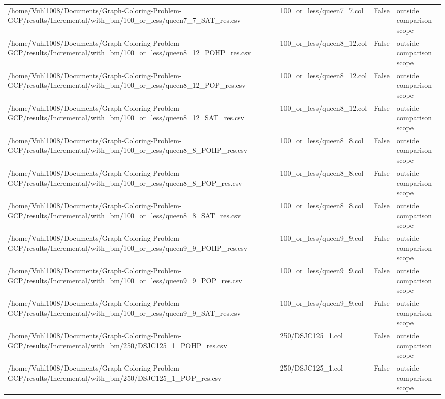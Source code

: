 \begin{table}[htbp]
\begin{tabular}{llll}
/home/Vuhl1008/Documents/Graph-Coloring-Problem-GCP/results/Incremental/with\_bm/100\_or\_less/queen7\_7\_SAT\_res.csv & 100\_or\_less/queen7\_7.col & False & outside comparison scope \\
/home/Vuhl1008/Documents/Graph-Coloring-Problem-GCP/results/Incremental/with\_bm/100\_or\_less/queen8\_12\_POHP\_res.csv & 100\_or\_less/queen8\_12.col & False & outside comparison scope \\
/home/Vuhl1008/Documents/Graph-Coloring-Problem-GCP/results/Incremental/with\_bm/100\_or\_less/queen8\_12\_POP\_res.csv & 100\_or\_less/queen8\_12.col & False & outside comparison scope \\
/home/Vuhl1008/Documents/Graph-Coloring-Problem-GCP/results/Incremental/with\_bm/100\_or\_less/queen8\_12\_SAT\_res.csv & 100\_or\_less/queen8\_12.col & False & outside comparison scope \\
/home/Vuhl1008/Documents/Graph-Coloring-Problem-GCP/results/Incremental/with\_bm/100\_or\_less/queen8\_8\_POHP\_res.csv & 100\_or\_less/queen8\_8.col & False & outside comparison scope \\
/home/Vuhl1008/Documents/Graph-Coloring-Problem-GCP/results/Incremental/with\_bm/100\_or\_less/queen8\_8\_POP\_res.csv & 100\_or\_less/queen8\_8.col & False & outside comparison scope \\
/home/Vuhl1008/Documents/Graph-Coloring-Problem-GCP/results/Incremental/with\_bm/100\_or\_less/queen8\_8\_SAT\_res.csv & 100\_or\_less/queen8\_8.col & False & outside comparison scope \\
/home/Vuhl1008/Documents/Graph-Coloring-Problem-GCP/results/Incremental/with\_bm/100\_or\_less/queen9\_9\_POHP\_res.csv & 100\_or\_less/queen9\_9.col & False & outside comparison scope \\
/home/Vuhl1008/Documents/Graph-Coloring-Problem-GCP/results/Incremental/with\_bm/100\_or\_less/queen9\_9\_POP\_res.csv & 100\_or\_less/queen9\_9.col & False & outside comparison scope \\
/home/Vuhl1008/Documents/Graph-Coloring-Problem-GCP/results/Incremental/with\_bm/100\_or\_less/queen9\_9\_SAT\_res.csv & 100\_or\_less/queen9\_9.col & False & outside comparison scope \\
/home/Vuhl1008/Documents/Graph-Coloring-Problem-GCP/results/Incremental/with\_bm/250/DSJC125\_1\_POHP\_res.csv & 250/DSJC125\_1.col & False & outside comparison scope \\
/home/Vuhl1008/Documents/Graph-Coloring-Problem-GCP/results/Incremental/with\_bm/250/DSJC125\_1\_POP\_res.csv & 250/DSJC125\_1.col & False & outside comparison scope \\

\end{tabular}
\end{table}
